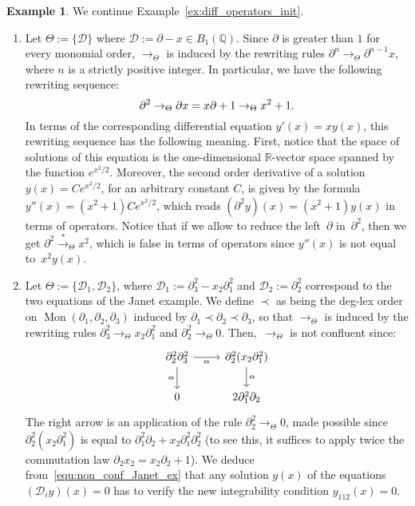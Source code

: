 \documentclass[11pt]{article}
\theoremstyle{definition}
\newtheorem{example}[theorem]{Example}
\newcommand\D{\mathcal{D}}
\newcommand\Q{\mathbb{Q}}
\newcommand\R{\mathbb{R}}
\newcommand\Weyl[1]{B_{#1}(\Q)}
\DeclareMathOperator{\Mon}{Mon}
\newcommand\rewTheta{\to_\Theta}
\newcommand\transTheta{\overset{*}{\to}_\Theta}
\begin{document}
\begin{example}\label{ex:diff_operators_rew}
  We continue Example~\ref{ex:diff_operators_init}.
  \begin{enumerate}
  \item\label{it:ODE_rew} Let $\Theta:=\{\D\}$ where
    $\D:=\partial-x\in\Weyl{1}$. Since $\partial$ is greater than $1$ for
    every monomial order, $\rewTheta$ is induced by the rewriting rules
    $\partial^n\rewTheta \partial^{n-1}x$, where $n$ is a strictly
    positive integer. In particular, we have the following rewriting
    sequence:
    \[\partial^2\rewTheta\partial x=x\partial+1\rewTheta x^2+1.
    \smallskip\]
    In terms of the corresponding differential equation $y'(x)=xy(x)$,
    this rewriting sequence has the following meaning. First, notice that
    the space of solutions of this equation is the one-dimensional
    $\R$-vector space spanned by the function $e^{x^2/2}$. Moreover, the
    second order derivative of a solution $y(x)=Ce^{x^2/2}$, for an
    arbitrary constant $C$, is given by the formula
    $y''(x)=(x^2+1)Ce^{x^2/2}$, 
    which reads $(\partial^2y)(x)=(x^2+1)y(x)$ in terms of operators.
    Notice that if we allow to reduce the left~$\partial$ 
    in~$\partial^2$, then we get $\partial^2\transTheta x^2$, which is 
    false in terms of operators since $y''(x)$ is not equal to~$x^2y(x)$.
  \item\label{it:Janet_example_rew} Let $\Theta:=\{\D_1,\D_2\}$, where
    $\D_1:=\partial_3^2-x_2\partial_1^2$ and $\D_2:=\partial_2^2$
    correspond to the two equations of the Janet example. We define
    $\prec$ as being the deg-lex order on
    $\Mon(\partial_1,\partial_2,\partial_3)$ induced by
    $\partial_1\prec\partial_2\prec\partial_3$, so that $\rewTheta$ is
    induced by the rewriting rules
    $\partial_3^2\rewTheta x_2\partial_1^2$ and
    $\partial_2^2\rewTheta 0$. Then,~$\rewTheta$ is not confluent since:
    \begin{equation}\label{equ:non_conf_Janet_ex}
      \begin{tikzcd}
        \partial_2^2\partial_3^2\ar[d, "_\Theta"']\ar[r, "_\Theta"'] &
        \partial_2^2(x_2\partial_1^2)\ar[d, "_\Theta"]\\
        0 & 2\partial_1^2\partial_2
      \end{tikzcd}
    \end{equation}
    The right arrow is an application of the rule
    $\partial_2^2 \rewTheta 0$, made possible since
    $\partial_2^2(x_2\partial_1^2)$ is equal to
    $\partial_1^2\partial_2+x_2\partial_1^2\partial_2^2$ (to see this, it
    suffices to apply twice the commutation law
    $\partial_2x_2=x_2\partial_2+1$).  We deduce
    from~\eqref{equ:non_conf_Janet_ex} that any solution $y(x)$ of the
    equations $(\D_iy)(x)=0$ has to verify the new integrability
    condition $y_{112}(x)=0$.
  \end{enumerate}
\end{example}
\smallskip
\end{document}
